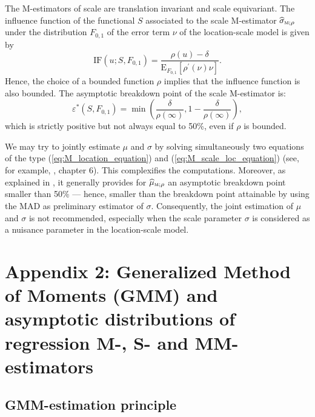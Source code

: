 The M-estimators of scale are translation invariant and scale equivariant. The
influence function of the functional $S$ associated to the scale M-estimator
$\sthat{\sigma}_{\stsc{M};\rho}$ under the distribution $F_{0,1}$ of the
error term $\nu$ of the location-scale model is given by
\[
\mathrm{IF}\left(  u;S,F_{0,1}\right)  =\frac{\rho\left(  u\right)  -\delta
}{\mathrm{E}_{F_{0,1}}\left[  \rho^{\prime}\left(  \nu\right)  \nu\right]  }.
\]
Hence, the choice of a bounded function $\rho$ implies that the influence
function is also bounded. The asymptotic breakdown point of the scale
M-estimator is:
\[
\varepsilon^{\ast}\left(  S,F_{0,1}\right)  =\min\left(  \frac{\delta}%
{\rho\left(  \infty\right)  },1-\frac{\delta}{\rho\left(  \infty\right)
}\right)  ,
\]
which is strictly positive but not always equal to 50\%, even if $\rho$ is bounded.

\begin{stremark}
We may try to jointly estimate $\mu$ and $\sigma$ by solving simultaneously
two equations of the type (\ref{eq:M_location_equation}) and
(\ref{eq:M_scale_loc_equation}) (see, for example, \citealp{Huber:2009}, chapter 6). This complexifies the computations. Moreover, as
explained in \cite{maronna:etal:2006}, it generally provides for
$\sthat{\mu}_{\stsc{M};\rho}$ an asymptotic breakdown point smaller than
50\% --- hence, smaller than the breakdown point attainable by using the MAD
as preliminary estimator of $\sigma$. Consequently, the joint estimation of
$\mu$ and $\sigma$ is not recommended, especially when the scale parameter
$\sigma$ is considered as a nuisance parameter in the location-scale model.
\end{stremark}

\section{Appendix 2: Generalized Method of Moments (GMM) and asymptotic
distributions of regression M-, S- and MM-estimators}

\subsection{GMM-estimation principle}

